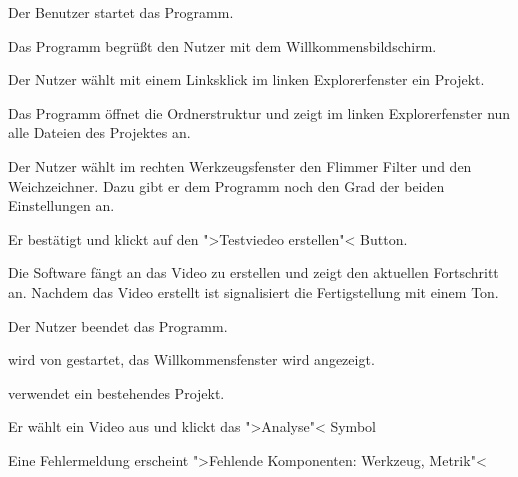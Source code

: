  \begin{compactenum}[1]
\item Der Benutzer startet das Programm.
\item Das Programm begrüßt den Nutzer mit dem Willkommensbildschirm.
\item Der Nutzer wählt mit einem Linksklick im linken Explorerfenster ein Projekt.
\item Das Programm öffnet die Ordnerstruktur und zeigt im linken Explorerfenster nun alle Dateien des Projektes an.
\item Der Nutzer wählt im rechten Werkzeugsfenster den Flimmer Filter und den Weichzeichner. Dazu gibt er dem Programm noch den Grad der beiden Einstellungen an.
\item Er bestätigt und klickt auf den ">Testviedeo erstellen"< Button.
\item Die Software fängt an das Video zu erstellen und zeigt den aktuellen Fortschritt an. Nachdem das Video erstellt ist signalisiert \projektTitel die Fertigstellung mit einem Ton.
\item Der Nutzer beendet das Programm.
\end{compactenum}

\begin{compactenum}[1]
\item \projektTitel wird von \dAU gestartet, das Willkommensfenster wird angezeigt.
\item \dAU verwendet ein bestehendes Projekt.
\item Er wählt ein Video aus und klickt das ">Analyse"< Symbol
\item Eine Fehlermeldung erscheint ">Fehlende Komponenten: Werkzeug, Metrik"<
\end{compactenum}

